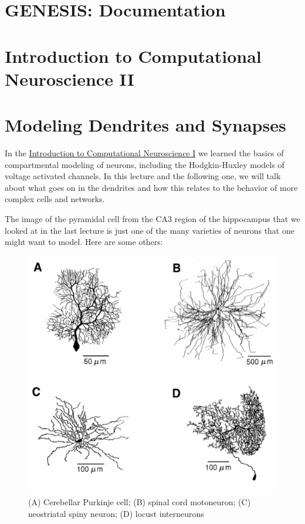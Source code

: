 \documentclass[12pt]{article}
\begin{document}
\section*{GENESIS: Documentation}

\section*{Introduction to Computational Neuroscience II}

\section*{Modeling Dendrites and Synapses}

In the \href{../compneurosci-1/compneurosci-1.tex}{Introduction to Computational Neuroscience I} we learned the basics of compartmental modeling of neurons, including the Hodgkin-Huxley models of voltage activated channels. In this lecture and the following one, we will talk about what goes on in the dendrites and how this relates to the behavior of more complex cells and networks.

The image of the pyramidal cell from the CA3 region of the hippocampus that we looked at in the last lecture is just one of the many varieties of neurons that one might want to model. Here are some others:

\begin{figure}[h]
  \centering
 \includegraphics[scale=0.4]{figures/BoGfig5_1s.eps}
  \caption{(A) Cerebellar Purkinje cell; (B) spinal cord motoneuron; (C) neostriatal spiny neuron; (D) locust interneurons}
  \label{fig:neurons}
\end{figure}
\end{document}
